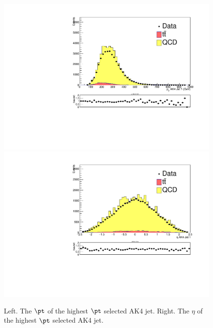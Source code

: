 \begin{figure}[thb!]
\begin{center}
\includegraphics[scale=0.34]{Figures/ratMCptJ1.pdf}
\includegraphics[scale=0.34]{Figures/ratMCetaJ1.pdf}\\
\end{center}
\caption{Left. The $\pt$ of the highest $\pt$ selected AK4 jet. Right. The $\eta$ of the highest $\pt$ selected AK4 jet.}
\label{fig:dMCAK41pteta}
\end{figure} 

